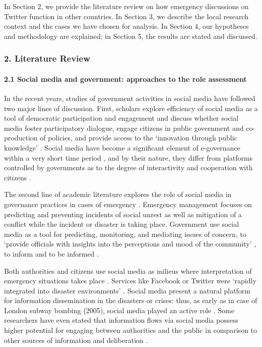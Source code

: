 In Section 2, we provide the literature review on how emergency discussions on Twitter function in other countries. In Section 3, we describe the local research context and the cases we have chosen for analysis. In Section 4, our hypotheses and methodology are explained; in Section 5, the results are stated and discussed.

\subsubsection{2. Literature Review}

\paragraph{2.1 Social media and government: approaches to the role assessment} 
In the recent years, studies of government activities in social media \cite{BarskyTrainorTorres,BertotJaegerHansen,BrunsLiang,CampbellLambrightWells,MendozaPobleteCastillo,Mergel,MergelBretschneider} have followed two major lines of discussion. First, scholars explore efficiency of social media as a tool of democratic participation and engagement \cite{BertotJaegerHansen} and discuss whether social media foster participatory dialogue, engage citizens in public government and co-production of policies, and provide access to the ‘innovation through public knowledge’ \cite[p.~31]{BertotJaegerGrimes}. Social media have become a significant element of e-governance within a very short time period \cite{BarskyTrainorTorres,BertotJaegerHansen,CenterForTechnology,Newman2011,OhKwonRao}, and by their nature, they differ from platforms controlled by governments as to the degree of interactivity and cooperation with citizens \cite{MendozaPobleteCastillo,Mergel}.

The second line of academic literature explores the role of social media in governance practices in cases of emergency \cite{BarashKelly,BrionesKuchLiu,MaciasHilyardFreimuth,PanagiotopoulosBarnettBigdeli}. Emergency management focuses on predicting and preventing incidents of social unrest as well as mitigation of a conflict while the incident or disaster is taking place. Government use social media as a tool for predicting, monitoring, and mediating issues of concern, to ‘provide officials with insights into the perceptions and mood of the community’ \cite[p.~481]{KavanaughFoxSheetz}, to inform and to be informed \cite{GasparPedroPanagiotopoulos,HughesPalenSutton}.

Both authorities and citizens use social media as milieus where interpretation of emergency situations takes place \cite{ComfortWaughCigler,HeverinZach,KavanaughFoxSheetz,Lodge,Osimo,PalenViewegAnderson,ProcterCrumpKarstedt}. Services like Facebook or Twitter were ‘rapidly integrated into disaster environments’ \cite[p.~547]{Comfort}. Social media present a natural platform for information dissemination in the disasters or crises: thus, as early as in case of London subway bombing (2005), social media played an active role \cite{ComfortWaughCigler}. Some researchers have even stated that information flows via social media possess higher potential for engaging between authorities and the public in comparison to other sources of information and deliberation \cite{Crump,SellnowSeeger}.

